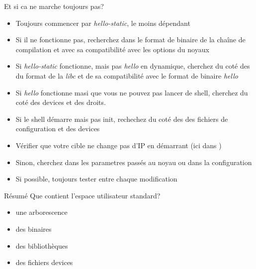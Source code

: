 \begin{frame}{Et si ca ne marche toujours pas?}
  \begin{itemize}
  \item Toujours commencer par  \emph{hello-static}, le moins dépendant
  \item Si il ne fonctionne  pas, recherchez dans le format de binaire
    de  la chaîne  de compilation  et avec  sa compatibilité  avec les
    options du noyaux
  \item  Si \emph{hello-static} fonctionne,  mais pas  \emph{hello} en
    dynamique, cherchez du coté des  du format de la \emph{libc} et de
    sa compatibilité avec le format de binaire \emph{hello}
  \item Si \emph{hello} fonctionne masi  que vous ne pouvez pas lancer
    de shell, cherchez du coté des devices et des droits.
  \item Si le  shell démarre mais pas init, rechechez  du coté des des
    fichiers de configuration et des devices
  \item Vérifier que votre cible  ne change pas d'IP en démarrant (ici
    dans )
  \item Sinon, cherchez dans les parametres passés au noyau ou dans la
    configuration
  \item Si possible, toujours tester entre chaque modification
  \end{itemize}
\end{frame}

\begin{frame}{Résumé}
  Que contient l'espace utilisateur standard?
  \begin{itemize}
  \item une arborescence
  \item des binaires
  \item des bibliothèques
  \item des fichiers devices
  \end{itemize}
\end{frame}

